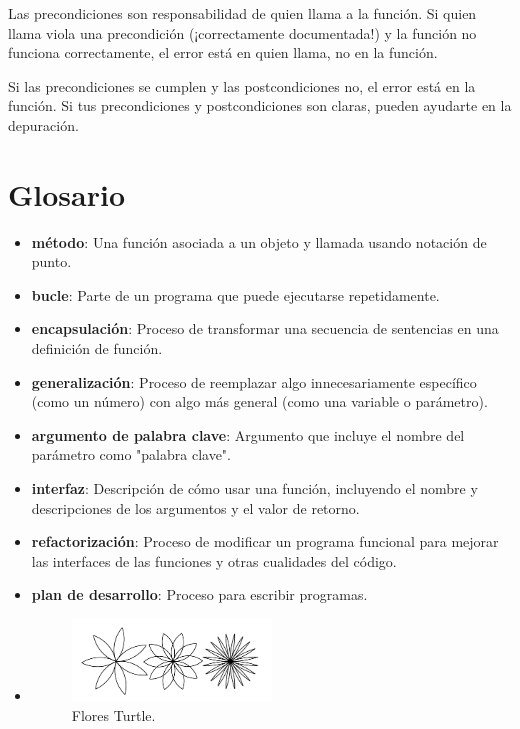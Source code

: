 Las precondiciones son responsabilidad de quien llama a la función. Si quien llama viola una precondición (¡correctamente documentada!) y la función no funciona correctamente, el error está en quien llama, no en la función.

Si las precondiciones se cumplen y las postcondiciones no, el error está en la función. Si tus precondiciones y postcondiciones son claras, pueden ayudarte en la depuración.

\section{Glosario}

\begin{itemize}
    \item \textbf{método}: Una función asociada a un objeto y llamada usando notación de punto.
    \item \textbf{bucle}: Parte de un programa que puede ejecutarse repetidamente.
    \item \textbf{encapsulación}: Proceso de transformar una secuencia de sentencias en una definición de función.
    \item \textbf{generalización}: Proceso de reemplazar algo innecesariamente específico (como un número) con algo más general (como una variable o parámetro).
    \item \textbf{argumento de palabra clave}: Argumento que incluye el nombre del parámetro como "palabra clave".
    \item \textbf{interfaz}: Descripción de cómo usar una función, incluyendo el nombre y descripciones de los argumentos y el valor de retorno.
    \item \textbf{refactorización}: Proceso de modificar un programa funcional para mejorar las interfaces de las funciones y otras cualidades del código.
    \item \textbf{plan de desarrollo}: Proceso para escribir programas.
    \item        
        \begin{figure}[h]
        \centering
        \includegraphics[width=0.5\textwidth]{./images/chapter_4_1.png}
        \caption{Flores Turtle.}
        \label{fig:4_1}

\end{figure}
\end{itemize}
